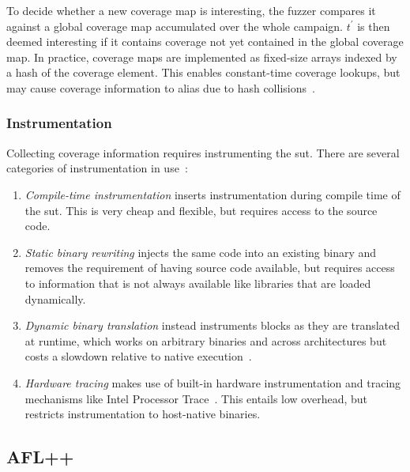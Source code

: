 To decide whether a new coverage map is interesting, the fuzzer compares it against
a global coverage map accumulated over the whole campaign.
$t^\prime$ is then deemed interesting if it contains coverage not yet contained in the global coverage map.
In practice, coverage maps are implemented as fixed-size arrays indexed by a hash of the coverage element.
This enables constant-time coverage lookups, but may cause coverage information to alias due to hash collisions~\cite{gan_collafl_2018}.

\subsubsection{Instrumentation}

Collecting coverage information requires instrumenting the \gls{sut}.
There are several categories of instrumentation in use~\cite{fioraldi_afl_nodate}:

\begin{enumerate}
  \item \emph{Compile-time instrumentation}
    inserts instrumentation during compile time of the \gls{sut}.
    This is very cheap and flexible, but requires access to the source code.

  \item \emph{Static binary rewriting}
    injects the same code into an existing binary and removes the requirement
    of having source code available, but requires access to information that is not
    always available like libraries that are loaded dynamically.

  \item \emph{Dynamic binary translation}
    instead instruments blocks as they are translated at runtime, which works
    on arbitrary binaries and across architectures but costs a slowdown
    relative to native execution~\cite{bellard_qemu_2005}.

  \item \emph{Hardware tracing}
    makes use of built-in hardware instrumentation and tracing mechanisms like
    Intel Processor Trace~\cite{zhang_ptfuzz_2018}. This entails low overhead,
    but restricts instrumentation to host-native binaries.
\end{enumerate}

\subsection{AFL++}\label{sec:fuzzing-aflpp}

